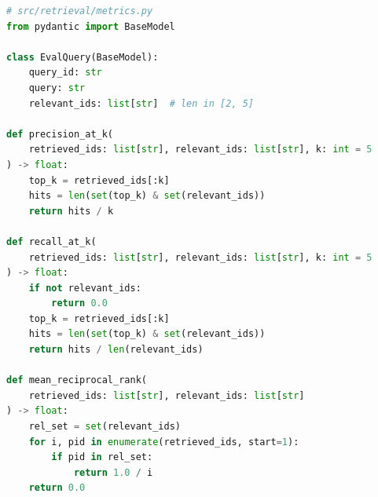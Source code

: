 \begin{lstlisting}[language=Python,
  caption={EvalQuery model and metric functions},
  label={lst:metrics}]
# src/retrieval/metrics.py
from pydantic import BaseModel

class EvalQuery(BaseModel):
    query_id: str
    query: str
    relevant_ids: list[str]  # len in [2, 5]

def precision_at_k(
    retrieved_ids: list[str], relevant_ids: list[str], k: int = 5
) -> float:
    top_k = retrieved_ids[:k]
    hits = len(set(top_k) & set(relevant_ids))
    return hits / k

def recall_at_k(
    retrieved_ids: list[str], relevant_ids: list[str], k: int = 5
) -> float:
    if not relevant_ids:
        return 0.0
    top_k = retrieved_ids[:k]
    hits = len(set(top_k) & set(relevant_ids))
    return hits / len(relevant_ids)

def mean_reciprocal_rank(
    retrieved_ids: list[str], relevant_ids: list[str]
) -> float:
    rel_set = set(relevant_ids)
    for i, pid in enumerate(retrieved_ids, start=1):
        if pid in rel_set:
            return 1.0 / i
    return 0.0
\end{lstlisting}

